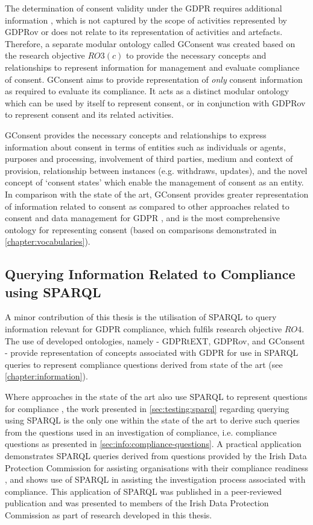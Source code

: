 The determination of consent validity under the GDPR requires additional information \cite{politou_forgetting_2018,article_29_data_protection_working_party_guidelines_2018}, which is not captured by the scope of activities represented by GDPRov or does not relate to its representation of activities and artefacts.
Therefore, a separate modular ontology called GConsent was created based on the research objective $RO3(c)$ to provide the necessary concepts and relationships to represent information for management and evaluate compliance of consent.
GConsent aims to provide representation of \textit{only} consent information as required to evaluate its compliance. It acts as a distinct modular ontology which can be used by itself to represent consent, or in conjunction with GDPRov to represent consent and its related activities.

GConsent provides the necessary concepts and relationships to express information about consent in terms of entities such as individuals or agents, purposes and processing, involvement of third parties, medium and context of provision, relationship between instances (e.g. withdraws, updates), and the novel concept of `consent states' which enable the management of consent as an entity. 
In comparison with the state of the art, GConsent provides greater representation of information related to consent as compared to other approaches related to consent and data management for GDPR \cite{peras_guidelines_2018}, and is the most comprehensive ontology for representing consent (based on comparisons demonstrated in \autoref{chapter:vocabularies}).

\subsection{Querying Information Related to Compliance using SPARQL}\label{sec:contributions:querying}
A minor contribution of this thesis is the utilisation of SPARQL to query  information relevant for GDPR compliance, which fulfils research objective $RO4$.
The use of developed ontologies, namely - GDPRtEXT, GDPRov, and GConsent - provide representation of concepts associated with GDPR for use in SPARQL queries to represent compliance questions derived from state of the art (see \autoref{chapter:information}).

Where approaches in the state of the art also use SPARQL to represent questions for compliance \cite{agarwal_legislative_2018,palmirani_pronto_2018}, the work presented in \autoref{sec:testing:sparql} regarding querying using SPARQL is the only one within the state of the art to derive such queries from the questions used in an investigation of compliance, i.e. compliance questions as presented in \autoref{sec:info:compliance-questions}.
A practical application demonstrates SPARQL queries derived from questions provided by the Irish Data Protection Commission for assisting organisations with their compliance readiness \cite{GDPR_readiness_checklist}, and shows use of SPARQL in assisting the investigation process associated with compliance.
This application of SPARQL was published in a peer-reviewed publication \cite{pandit_queryable_2018} and was presented to members of the Irish Data Protection Commission as part of research developed in this thesis.

